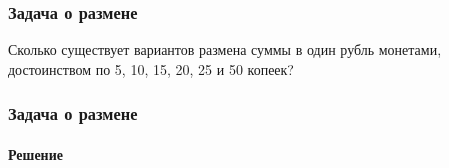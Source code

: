 \begin{frame}
    \begin{algorithm}[H]
        \caption{$s(n)$}
        \begin{algorithmic}[1]
        \end{algorithmic}
    \end{algorithm}
    
    \begin{algorithm}[H]
        \caption{$\texttt{doWhileIter}(i, n, s)$}
        \begin{algorithmic}[1]
            \ENDIF
        \end{algorithmic}
    \end{algorithm}
    
    \begin{algorithm}[H]
        \caption{$\texttt{doWhileRec}(i, n)$}
        \begin{algorithmic}[1]
            \ENDIF
        \end{algorithmic}
    \end{algorithm}
\end{frame}
    
\begin{frame}
    \frametitle{Задача о размене}
    \begin{example}
        Сколько существует вариантов размена суммы в один рубль монетами, достоинством по 5, 10, 15, 20, 25 и 50 копеек?
    \end{example}
\end{frame}

\begin{frame}
    \frametitle{Задача о размене}
    \framesubtitle{Решение}
    
    \begin{algorithm}[H]
        \caption{$sс(s, ct)$}
        \begin{algorithmic}[1]
            
            \ELSE
            \ENDIF
        \end{algorithmic}
    \end{algorithm}
\end{frame}

